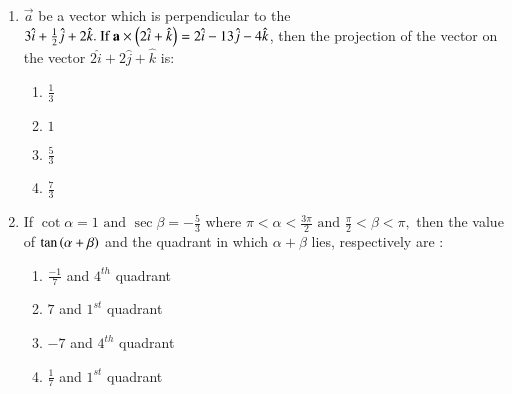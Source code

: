 \documentclass[journal]{IEEEtran}
\theoremstyle{remark}
\begin{document}
\begin{enumerate}[start=11]
\item   
 $\vec{a}$ be a vector which is perpendicular to the  $3\hat{i} + \frac{1}{2}\hat{j} + 2\hat{k}.  \text{ If }  \mathbf{a} \times \left(2\hat{i} + \hat{k}\right) = 2\hat{i} - 13\hat{j} - 4\hat{k}$, then the projection of the vector on the vector
$2\hat{i} + 2\hat{j} + \hat{k} $ is: 

\begin{multicols}{4}
\begin{enumerate}
\item $\frac{1}{3}$
\item $1$
\item $\frac{5}{3}$
\item $\frac{7}{3}$
\end{enumerate}
\end{multicols}

\item  If
$\cot{\alpha} = 1   \text{ and }   \sec{\beta} = -\frac{5}{3} \text{ where }   \pi < \alpha < \frac{3\pi}{2}   \text{ and }   \frac{\pi}{2} < \beta < \pi,$ then the value of $\tan \left(\alpha + \beta\right)$ and the quadrant in which $\alpha + \beta$ lies, respectively are :

\begin{multicols}{2}
\begin{enumerate}
\item $\frac{-1}{7} $ and $4^{th}$ quadrant
\item $7 $ and $1^{st}$ quadrant
\item $-7$ and $4^{th}$ quadrant
\item $\frac{1}{7} $ and $1^{st}$ quadrant
\end{enumerate}
\end{multicols}

\end{enumerate}
\end{document}
